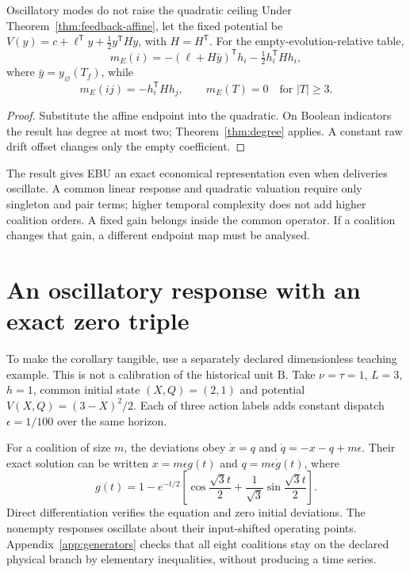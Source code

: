 \begin{corollary}{Oscillatory modes do not raise the quadratic ceiling}\label{cor:feedback-pair-only}
Under Theorem~\ref{thm:feedback-affine}, let the fixed potential be
$V(y)=c+\ell^{\mathsf T}y+\tfrac12y^{\mathsf T}Hy$, with $H=H^{\mathsf T}$. For the empty-evolution-relative table,
\begin{equation}\label{eq:feedback-pair-only}
 m_E(i)=-(\ell+H\bar y)^{\mathsf T}h_i-\tfrac12h_i^{\mathsf T}Hh_i,
\end{equation}
where $\bar y=y_\varnothing(T_f)$, while
\begin{equation}
 m_E(ij)=-h_i^{\mathsf T}Hh_j,
 \qquad m_E(T)=0\quad\text{for }|T|\geq3.
\end{equation}
\end{corollary}
\begin{proof}
Substitute the affine endpoint into the quadratic. On Boolean indicators the result has degree at most two; Theorem~\ref{thm:degree} applies. A constant raw drift offset changes only the empty coefficient.
\end{proof}

The result gives EBU an exact economical representation even when deliveries oscillate. A common linear response and quadratic valuation require only singleton and pair terms; higher temporal complexity does not add higher coalition orders. A fixed gain belongs inside the common operator. If a coalition changes that gain, a different endpoint map must be analysed.

\section{An oscillatory response with an exact zero triple}
To make the corollary tangible, use a separately declared dimensionless teaching example. This is not a calibration of the historical unit $\mathrm B$. Take $\nu=\tau=1$, $L=3$, $h=1$, common initial state $(X,Q)=(2,1)$ and potential $V(X,Q)=(3-X)^2/2$. Each of three action labels adds constant dispatch $\epsilon=1/100$ over the same horizon.

For a coalition of size $m$, the deviations obey $\dot x=q$ and $\dot q=-x-q+m\epsilon$. Their exact solution can be written $x=m\epsilon g(t)$ and $q=m\epsilon\dot g(t)$, where
\begin{equation}\label{eq:feedback-response}
 g(t)=1-e^{-t/2}\left[\cos\frac{\sqrt3t}{2}
       +\frac1{\sqrt3}\sin\frac{\sqrt3t}{2}\right].
\end{equation}
Direct differentiation verifies the equation and zero initial deviations. The nonempty responses oscillate about their input-shifted operating points. Appendix~\ref{app:generators} checks that all eight coalitions stay on the declared physical branch by elementary inequalities, without producing a time series.

